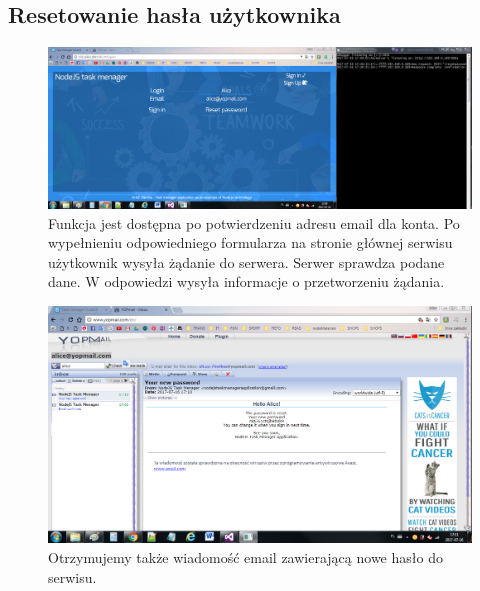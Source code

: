 \documentclass[12pt]{report}
\begin{document}
\subsection{Resetowanie hasła użytkownika}
\begin{figure}[!hb]
\centering
\includegraphics[width=\textwidth,height=\textheight,keepaspectratio]{52.png}
\captionsetup{labelformat=empty}
\caption[]{Funkcja jest dostępna po potwierdzeniu adresu email dla konta. 
Po wypełnieniu odpowiedniego formularza na stronie głównej serwisu użytkownik wysyła żądanie do serwera. 
Serwer sprawdza podane dane. W odpowiedzi wysyła informacje o przetworzeniu żądania.}
\end{figure}
\begin{figure}[!hb]
\centering
\includegraphics[width=\textwidth,height=\textheight,keepaspectratio]{53.png}
\captionsetup{labelformat=empty}
\caption[]{Otrzymujemy także wiadomość email zawierającą nowe hasło do serwisu.}
\end{figure}

\newpage 
\end{document}
